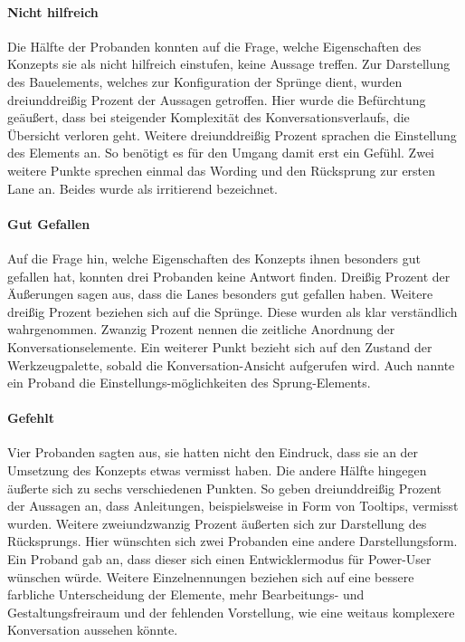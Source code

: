 \paragraph{Nicht hilfreich}Die Hälfte der Probanden konnten auf die Frage, welche Eigenschaften des Konzepts sie als nicht hilfreich einstufen, keine Aussage treffen. Zur Darstellung des Bauelements, welches zur Konfiguration der Sprünge dient, wurden dreiunddreißig Prozent der Aussagen getroffen. Hier wurde die Befürchtung geäußert, dass bei steigender Komplexität des Konversationsverlaufs, die Übersicht verloren geht. Weitere dreiunddreißig Prozent sprachen die Einstellung des Elements an. So benötigt es für den Umgang damit erst ein Gefühl. Zwei weitere Punkte sprechen einmal das Wording und den Rücksprung zur ersten Lane an. Beides wurde als irritierend bezeichnet.

\paragraph{Gut Gefallen}Auf die Frage hin, welche Eigenschaften des Konzepts ihnen besonders gut gefallen hat, konnten drei Probanden keine Antwort finden. Dreißig Prozent der Äußerungen sagen aus, dass die Lanes besonders gut gefallen haben. Weitere dreißig Prozent beziehen sich auf die Sprünge. Diese wurden als klar verständlich wahrgenommen. Zwanzig Prozent nennen die zeitliche Anordnung der Konversationselemente. Ein weiterer Punkt bezieht sich auf den Zustand der Werkzeugpalette, sobald die Konversation-Ansicht aufgerufen wird. Auch nannte ein Proband die Einstellungs-möglichkeiten des Sprung-Elements.

\paragraph{Gefehlt}Vier Probanden sagten aus, sie hatten nicht den Eindruck, dass sie an der Umsetzung des Konzepts etwas vermisst haben. Die andere Hälfte hingegen äußerte sich zu sechs verschiedenen Punkten. So geben dreiunddreißig Prozent der Aussagen an, dass Anleitungen, beispielsweise in Form von Tooltips, vermisst wurden. Weitere zweiundzwanzig Prozent äußerten sich zur Darstellung des Rücksprungs. Hier wünschten sich zwei Probanden eine andere Darstellungsform. Ein Proband gab an, dass dieser sich einen Entwicklermodus für Power-User wünschen würde. Weitere Einzelnennungen beziehen sich auf eine bessere farbliche Unterscheidung der Elemente, mehr Bearbeitungs- und Gestaltungsfreiraum und der fehlenden Vorstellung, wie eine weitaus komplexere Konversation aussehen könnte.    

